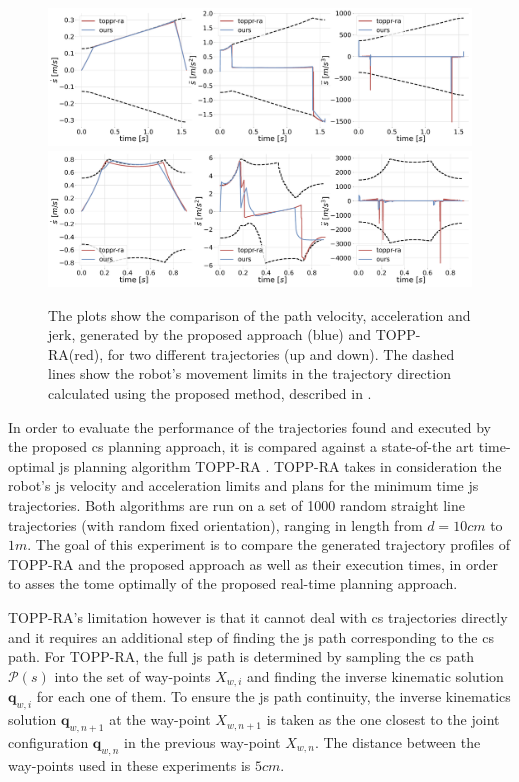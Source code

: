 \begin{figure}[!t]
    \centering
    \includegraphics[width=\linewidth]{Papers/imgs/ruckig_toppra_comp1679478306.pdf}
    \includegraphics[width=\linewidth]{Papers/imgs/ruckig_toppra_comp1681374566.pdf}
    \caption{The plots show the comparison of the path velocity, acceleration and jerk, generated by the proposed approach (blue) and TOPP-RA(red), for two different trajectories (up and down). The dashed lines show the robot's movement limits in the trajectory direction calculated using the proposed method, described in . }
    \label{fig:comparison_trajectory}
\end{figure}

In order to evaluate the performance of the trajectories found and executed by the proposed \gls{cs} planning approach, it is compared against a state-of-the art time-optimal \gls{js} planning algorithm TOPP-RA \cite{Pham2018}. TOPP-RA takes in consideration the robot's \gls{js} velocity and acceleration limits and plans for the minimum time \gls{js} trajectories.
Both algorithms are run on a set of 1000 random straight line trajectories (with random fixed orientation), ranging in length from $d=10cm$ to $1m$. The goal of this experiment is to compare the generated trajectory profiles of TOPP-RA and the proposed approach as well as their execution times, in order to asses the tome optimally of the proposed real-time planning approach. 

TOPP-RA's limitation however is that it cannot deal with \gls{cs} trajectories directly and it requires an additional step of finding the \gls{js} path corresponding to the \gls{cs} path. For TOPP-RA, the full \gls{js} path is determined by sampling the \gls{cs} path $\mathscr{P}(s)$ into the set of way-points $X_{w,i}$ and finding the inverse kinematic solution $\bm{q}_{w,i}$ for each one of them. To ensure the \gls{js} path continuity, the inverse kinematics solution $\bm{q}_{w,n+1}$ at the way-point $X_{w,n+1}$ is taken as the one closest to the joint configuration $\bm{q}_{w,n}$ in the previous way-point $X_{w,n}$. The distance between the way-points used in these experiments is $5cm$. 


